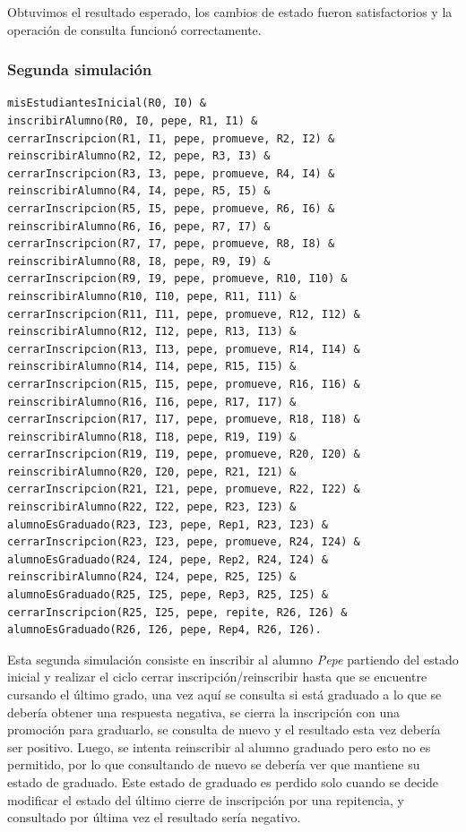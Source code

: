 \documentclass{article}
\begin{document}
Obtuvimos el resultado esperado, los cambios de estado fueron satisfactorios y la operación de consulta funcionó correctamente.

\subsubsection*{Segunda simulación}
\begin{verbatim}
misEstudiantesInicial(R0, I0) &
inscribirAlumno(R0, I0, pepe, R1, I1) &
cerrarInscripcion(R1, I1, pepe, promueve, R2, I2) &
reinscribirAlumno(R2, I2, pepe, R3, I3) &
cerrarInscripcion(R3, I3, pepe, promueve, R4, I4) &
reinscribirAlumno(R4, I4, pepe, R5, I5) &
cerrarInscripcion(R5, I5, pepe, promueve, R6, I6) &
reinscribirAlumno(R6, I6, pepe, R7, I7) &
cerrarInscripcion(R7, I7, pepe, promueve, R8, I8) &
reinscribirAlumno(R8, I8, pepe, R9, I9) &
cerrarInscripcion(R9, I9, pepe, promueve, R10, I10) &
reinscribirAlumno(R10, I10, pepe, R11, I11) &
cerrarInscripcion(R11, I11, pepe, promueve, R12, I12) &
reinscribirAlumno(R12, I12, pepe, R13, I13) &
cerrarInscripcion(R13, I13, pepe, promueve, R14, I14) &
reinscribirAlumno(R14, I14, pepe, R15, I15) &
cerrarInscripcion(R15, I15, pepe, promueve, R16, I16) &
reinscribirAlumno(R16, I16, pepe, R17, I17) &
cerrarInscripcion(R17, I17, pepe, promueve, R18, I18) &
reinscribirAlumno(R18, I18, pepe, R19, I19) &
cerrarInscripcion(R19, I19, pepe, promueve, R20, I20) &
reinscribirAlumno(R20, I20, pepe, R21, I21) &
cerrarInscripcion(R21, I21, pepe, promueve, R22, I22) &
reinscribirAlumno(R22, I22, pepe, R23, I23) &
alumnoEsGraduado(R23, I23, pepe, Rep1, R23, I23) &
cerrarInscripcion(R23, I23, pepe, promueve, R24, I24) &
alumnoEsGraduado(R24, I24, pepe, Rep2, R24, I24) &
reinscribirAlumno(R24, I24, pepe, R25, I25) &
alumnoEsGraduado(R25, I25, pepe, Rep3, R25, I25) &
cerrarInscripcion(R25, I25, pepe, repite, R26, I26) &
alumnoEsGraduado(R26, I26, pepe, Rep4, R26, I26).
\end{verbatim}

Esta segunda simulación consiste en inscribir al alumno \emph{Pepe} partiendo del estado inicial y realizar el ciclo cerrar inscripción/reinscribir hasta que se encuentre cursando el último grado, una vez aquí se consulta si está graduado a lo que se debería obtener una respuesta negativa, se cierra la inscripción con una promoción para graduarlo, se consulta de nuevo y el resultado esta vez debería ser positivo. Luego, se intenta reinscribir al alumno graduado pero esto no es permitido, por lo que consultando de nuevo se debería ver que mantiene su estado de graduado. Este estado de graduado es perdido solo cuando se decide modificar el estado del último cierre de inscripción por una repitencia, y consultado por última vez el resultado sería negativo.
\end{document}
